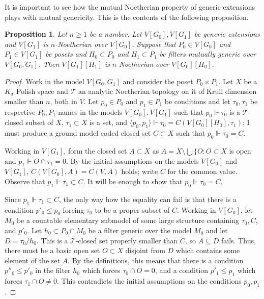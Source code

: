 \documentclass{article}
\newcommand{\gs}{\sigma}
\newtheorem{proposition}[theorem]{Proposition}
\theoremstyle{definition}
\begin{document}
\noindent It is important to see how the mutual Noetherian property of generic extensions plays with mutual genericity. This is the contents of the following proposition.

\begin{proposition}
\label{productproposition}
Let $n\geq 1$ be a number. Let $V[G_0], V[G_1]$ be generic extensions and $V[G_1]$ is $n$-Noetherian over $V[G_0]$. Suppose that $P_0\in V[G_0]$ and $P_1\in V[G_1]$ be posets and $H_0\subset P_0$ and $H_1\subset P_1$ be filters mutually generic over $V[G_0, G_1]$. Then $V[G_1][H_1]$ is $n$ Noetherian over $V[G_0][H_0]$.
\end{proposition}

\begin{proof}
Work in the model $V[G_0, G_1]$ and consider the poset $P_0\times P_1$. Let $X$ be a $K_\gs$ Polish space and $\mathcal{T}$ an analytic Noetherian topology on it of Krull dimension smaller than $n$, both in $V$. Let $p_0\in P_0$ and $p_1\in P_1$ be conditions and let $\tau_0, \tau_1$ be respective $P_0, P_1$-names in the models $V[G_0], V[G_1]$ such that $p_0\Vdash\tau_0$ is a $\mathcal{T}$-closed subset of $X$, $\tau_1\subset X$ is a set, and $\langle p_0, p_1\rangle\Vdash\tau_0= C(V[G_0][H_0], \tau_1)$; I must produce a ground model coded closed set $C\subset X$ such that $p_0\Vdash\tau_0=C$. 

Working in $V[G_1]$, form the closed set $A\subset X$ as $A=X\setminus \bigcup\{O\colon O\subset X$ is open and $p_1\Vdash O\cap\tau_1=0$. By the initial assumptions on the models $V[G_0]$ and $V[G_1]$, $C(V[G_0], A)=C(V, A)$ holds; write $C$ for the common value. Observe that $p_1\Vdash\tau_1\subset C$.  It will be enough to show that $p_0\Vdash \tau_0=C$.

Since $p_1\Vdash\tau_1\subset C$, the only way how the equality can fail is that there is a condition $p'_0\leq p_0$ forcing $\tau_0$ to be a proper subset of $C$. Working in $V[G_0]$, let $M_0$ be a countable elementary submodel of some large structure containing $\tau_0, C$, and $p'_0$. Let $h_0\subset P_0\cap M_0$ be a filter generic over the model $M_0$ and let $D=\tau_0/h_0$. This is a $\mathcal{T}$-closed set properly smaller than $C$, so $A\subseteq D$ fails. Thus, there must be a basic open set $O\subset X$ disjoint from $D$ which contains some element of the set $A$. By the definitions, this means that there is a condition $p''_0\leq p'_0$ in the filter $h_0$ which forces $\tau_0\cap O=0$, and a condition $p'_1\leq p_1$ which forces $\tau_1\cap O\neq 0$. This contradicts the initial assumptions on the conditions $p_0, p_1$.
\end{proof}
\end{document}
